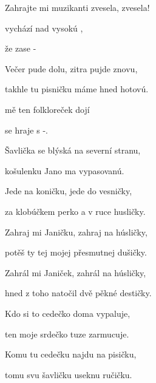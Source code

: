 

Zahrajte mi muzikanti zvesela, zvesela!

\zs
{} vychází nad vysokú ,

 že   zase -

Večer pude dolu, zitra pujde znovu,

takhle tu pisničku máme hned hotovú.
\ks

\zr
{} mě ten folkloreček {do}{jí}

 se hraje   s -.
\kr

\zs
Šavlička se blýská na severní stranu,

košulenku Jano ma vypasovanú.

Jede na koničku, jede do vesničky,

za klobúčkem perko a v ruce husličky.
\ks

\zr  \kr

\zs
Zahraj mi Janičku, zahraj na húsličky,

potěš ty tej mojej přesmutnej dušičky.

Zahrál mi Janiček, zahrál na húsličky,

hned z toho natočil dvě pěkné destičky.

\ks

\zr  \kr

\zs
Kdo si to cedečko doma vypaluje,

ten moje srdečko tuze zarmucuje.

Komu tu cedečku najdu na pisičku,

tomu svu šavličku useknu ručičku.
\ks

\zr  \kr

\kp

